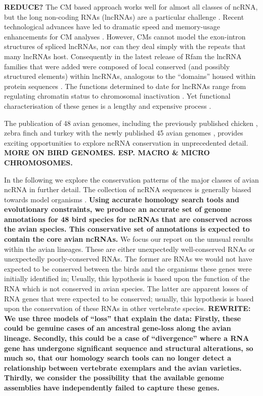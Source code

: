 \documentclass[10pt]{bmc_article}
\newenvironment{bmcformat}{\begin{raggedright}\baselineskip20pt\sloppy\setboolean{publ}{false}}{\end{raggedright}\baselineskip20pt\sloppy}
\begin{document}
\begin{bmcformat}
{\bf REDUCE?}
The CM based approach works well for almost all classes of ncRNA, but
the long non-coding RNAs (lncRNAs) are a particular challenge
\cite{Guttman:2009}. Recent technological advances have led to
dramatic speed and memory-usage enhancements for CM analyses
\cite{Eddy:2002,Nawrocki:2007,Nawrocki:2009,Eddy:2011}. However, CMs
cannot model the exon-intron structures of spliced lncRNAs, nor can
they deal simply with the repeats that many lncRNAs host. Consequently
in the latest release of Rfam the lncRNA families that were added were
composed of local conserved (and possibly structured elements) within
lncRNAs, analogous to the ``domains'' housed within protein sequences
\cite{Burge:2013}. The functions determined to date for lncRNAs range
from regulating chromatin status to chromosomal inactivation
\cite{Rinn:2007,Chow:2005}. Yet functional characterisation of these
genes is a lengthy and expensive process \cite{Guttman:2009}.

The publication of 48 avian genomes, including the previously
published chicken
\cite{International_Chicken_Genome_Sequencing_Consortium:2004}, zebra
finch \cite{Warren:2010} and turkey \cite{Dalloul:2010} with the newly
published 45 avian genomes \cite{birds:14,birds:14a}, provides
exciting opportunities to explore ncRNA conservation in
unprecedented detail. {\bf MORE ON BIRD GENOMES. ESP. MACRO \& MICRO
  CHROMOSOMES.}

In the following we explore the conservation patterns of the major
classes of avian ncRNA in further detail. The collection of ncRNA
sequences is generally biased towards model organisms
\cite{Gardner:2010,Hoeppner:2012}.  {\bf Using accurate homology
  search tools and evolutionary constraints, we produce an accurate
  set of genome annotations for 48 bird species for ncRNAs that are
  conserved across the avian species. This conservative set of
  annotations is expected to contain the core avian ncRNAs.}
We focus our
report on the unusual results within the avian lineages. These are
either unexpectedly well-conserved RNAs or unexpectedly
poorly-conserved RNAs. The former are RNAs we would not have expected
to be conserved between the birds and the organisms these genes were
initially identified in; Usually, this hypothesis is based upon the
function of the RNA which is not conserved in avian species. The
latter are apparent losses of RNA genes that were expected to be
conserved; usually, this hypothesis is based upon the conservation of
these RNAs in other vertebrate species.  {\bf REWRITE: We use three
  models of ``loss'' that explain the data: Firstly, these could be
  genuine cases of an ancestral gene-loss along the avian
  lineage. Secondly, this could be a case of ``divergence'' where a
  RNA gene has undergone significant sequence and structural
  alterations, so much so, that our homology search tools can no
  longer detect a relationship between vertebrate exemplars and the
  avian varieties. Thirdly, we consider the possibility that the
  available genome assemblies have independently failed to capture
  these genes.}


\end{bmcformat}
\end{document}
